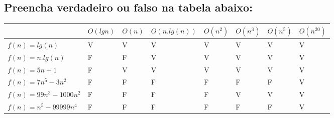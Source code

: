 \documentclass[12pt]{article}
\begin{document}
{\subsection{Preencha verdadeiro ou falso na tabela abaixo:}
\begin{table}[htb]
    \begin{tabular}{|l|l|l|l|l|l|l|l|} \hline
                              & $O(lg n)$ & $O(n)$ & $O(n.lg(n))$ & $O(n^2)$ & $O(n^3)$ & $O(n^5)$ & $O(n^20)$ \\ \hline
    $f(n) = lg(n)$            & V         & V      & V            & V        & V        & V        & V         \\ \hline
    $f(n) = n . lg(n)$        & F         & F      & V            & V        & V        & V        & V         \\ \hline
    $f(n) = 5n + 1$           & F         & V      & V            & V        & V        & V        & V         \\ \hline
    $f(n) = 7n^5 - 3n^2$      & F         & F      & F            & F        & F        & F        & V         \\ \hline
    $f(n) = 99n^3 - 1000n^2$  & F         & F      & F            & F        & V        & V        & V         \\ \hline
    $f(n) = n^5 - 99999n^4$   & F         & F      & F            & F        & F        & F        & V         \\ \hline
    \end{tabular}
\end{table}

}
\end{document}
